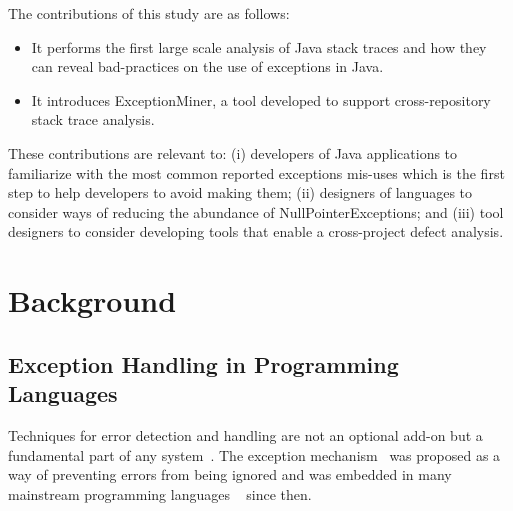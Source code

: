 \documentclass[conference]{IEEEtran}
\begin{document}
The contributions of this study are as follows:
\begin{itemize}

  \item  It performs the first large scale analysis of Java stack traces and how
    they can reveal bad-practices on the use of exceptions in Java.

  \item  It introduces ExceptionMiner, a tool developed to support cross-repository stack trace
    analysis.

\end{itemize}

These contributions are relevant to:
(i) developers of Java applications
to familiarize with the most common reported exceptions mis-uses which is the
first step to help developers to avoid making them;
(ii) designers of languages
to consider ways of reducing the abundance of NullPointerExceptions;
and (iii)
tool designers to consider developing tools that enable a cross-project defect
analysis.



\section{Background}

\subsection{Exception Handling in Programming Languages}

Techniques for error detection and handling are not  an optional add-on but a
fundamental part of any system~\cite{bruntink2006discovering}. 
The exception mechanism~\cite{goodenough1975exception} was proposed as a way of
preventing errors from being ignored and was embedded in many mainstream
programming languages ~\cite{garcia2001comparative} since then. 
\end{document}
